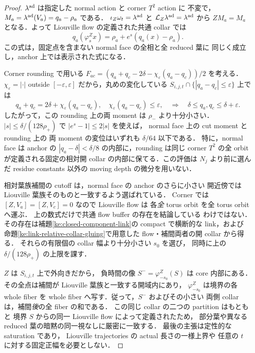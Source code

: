 \begin{proof}
$\lambda^{\rm ad}$ は指定した normal action と corner $T^2$ action に
不変で，$M_a=\lambda^{\rm ad}(V_a)=q_a-\rho_a$ である．
$\iota_Z\omega_t=\lambda^{\rm ad}$ と
$\mathcal L_Z\lambda^{\rm ad}=\lambda^{\rm ad}$ から
$ZM_a=M_a$ となる．よって Liouville flow の定義された共通
collar では
\[
 q_a(\varphi_s^Zx)=\rho_a+e^s(q_a(x)-\rho_a).
\]
この式は，固定点を含まない normal face の全相と全 reduced 葉に
同じく成立し，anchor 上では表示された式になる．

Corner rounding で用いる
$F_{ac}=(q_a+q_c-2\delta-\chi_\varepsilon(q_a-q_c))/2$
を考える．$\chi_\varepsilon=|\cdot|$ outside
$[-\varepsilon,\varepsilon]$ だから，丸めの変化している
$S_{i,j,t}\cap\{|q_a-q_c|\le\varepsilon\}$ 上では
\[
 q_a+q_c=2\delta+\chi_\varepsilon(q_a-q_c),\quad
 \chi_\varepsilon(q_a-q_c)\le\varepsilon,
 \quad\Longrightarrow\quad
 \delta\le q_a,q_c\le\delta+\varepsilon .
\]
したがって，この rounding 上の両 moment は
$\rho_-$ より十分小さい．$|s|\le\delta/(128\rho_+)$
で $\lvert e^s-1\rvert\le2|s|$ を使えば，
normal face 上の cut moment と rounding 上の
両 moment の変位はいずれも $\delta/64$ 以下である．
特に，normal face は anchor の
$|q_a-\delta|<\delta/8$ の内部に，rounding は同じ
corner $T^2$ の全 orbit が定義される固定の相対開 collar
の内部に保てる．この評価は $N_j$ より前に選んだ
residue constants 以外の moving depth の微分を用いない．

相対葉族補間の cutoff は，normal face の anchor のさらに小さい
開近傍では Liouville 葉族そのものと一致するよう選ばれている．
Corner では $[Z,V_a]=[Z,V_c]=0$ なので Liouville flow は
各\emph{全} torus orbit を全 torus orbit へ運ぶ．
上の数式だけで共通 flow buffer の存在を結論している
わけではない．その存在は補題\ref{ke:closed-component-link}の
compact で横断的な link，および
命題\ref{ke:link-relative-collar-gluing}で用意した
flow・補間両者の開 collar から得る．
それらの有限個の collar 幅より十分小さい $s_0$ を選び，
同時に上の $\delta/(128\rho_+)$ の上限を課す．

$Z$ は $S_{i,j,t}$ 上で外向きだから，
負時間の像 $S^-=\varphi_{-s_0}^Z(S)$ は core 内部にある．
その全点は補間が Liouville 葉族と一致する開域内にあり，
$\varphi_{-s_0}^Z$ は境界の各 whole fiber を
whole fiber へ写す．従って，$S^-$ およびその小さい
両側 collar は，補間\emph{後}の全 fiber の和である．
この同じ collar の二つの partition はもともと
境界 $S$ からの同一 Liouville flow によって定義されたため，
部分葉や異なる reduced 葉の暗黙の同一視なしに厳密に一致する．
最後の主張は定性的な saturation であり，
Liouville trajectories の actual 長さの一様上界や
任意の $t$ に対する固定正幅を必要としない．
\end{proof}

